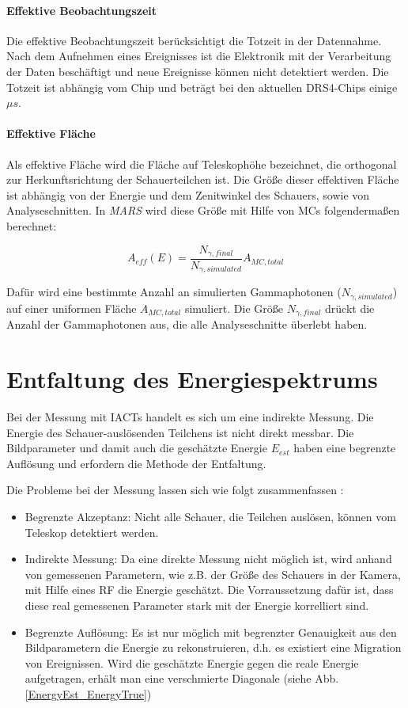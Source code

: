 \paragraph{Effektive Beobachtungszeit}
Die effektive Beobachtungszeit berücksichtigt die Totzeit in der Datennahme.
Nach dem Aufnehmen eines Ereignisses ist die Elektronik mit der Verarbeitung der Daten beschäftigt und neue Ereignisse können nicht detektiert werden.
Die Totzeit ist abhängig vom Chip und beträgt bei den aktuellen DRS4-Chips einige $\mu s$.\cite{Lichtkurve}

\paragraph{Effektive Fläche}
Als effektive Fläche wird die Fläche auf Teleskophöhe bezeichnet, die orthogonal zur Herkunftsrichtung der Schauerteilchen ist.
Die Größe dieser effektiven Fläche ist abhängig von der Energie und dem Zenitwinkel des Schauers, sowie von Analyseschnitten.
In \textit{MARS} wird diese Größe mit Hilfe von MCs folgendermaßen berechnet:

\begin{equation}
 A_{eff}(E)=\frac{N_{\gamma, final}}{N_{\gamma, simulated}}A_{MC, total}
\end{equation}

Dafür wird eine bestimmte Anzahl an simulierten Gammaphotonen ($N_{\gamma, simulated}$) auf einer uniformen Fläche $A_{MC,total}$ simuliert. 
Die Größe $N_{\gamma, final}$ drückt die Anzahl der Gammaphotonen aus, die alle Analyseschnitte überlebt haben.\cite{Lichtkurve}


\section{Entfaltung des Energiespektrums}
\label{sec:Unfolding}
Bei der Messung mit IACTs handelt es sich um eine indirekte Messung.
Die Energie des Schauer-auslösenden Teilchens ist nicht direkt messbar.
Die Bildparameter und damit auch die geschätzte Energie $E_{est}$ haben eine begrenzte Auflösung und erfordern die Methode der Entfaltung.

Die Probleme bei der Messung lassen sich wie folgt zusammenfassen \cite{UnfoldingTheorie}:

\begin{itemize}
 \item Begrenzte Akzeptanz: Nicht alle Schauer, die Teilchen auslösen, können vom Teleskop detektiert werden.
 \item Indirekte Messung: Da eine direkte Messung nicht möglich ist, wird anhand von gemessenen Parametern, wie z.B. der Größe des Schauers in der Kamera, mit Hilfe eines RF die Energie geschätzt.
       Die Vorraussetzung dafür ist, dass diese real gemessenen Parameter stark mit der Energie korrelliert sind.
 \item Begrenzte Auflösung: Es ist nur möglich mit begrenzter Genauigkeit aus den Bildparametern die Energie zu rekonstruieren, d.h. es existiert eine Migration von Ereignissen.
       Wird die geschätzte Energie gegen die reale Energie aufgetragen, erhält man eine verschmierte Diagonale (siehe Abb.\ref{EnergyEst_EnergyTrue})
\end{itemize}

